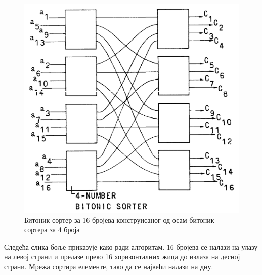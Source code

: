 \documentclass[12pt, a4paper]{article}
\theoremstyle{definition}
\begin{document}
\begin{figure}[H]
  \centering
      \includegraphics[scale=0.3]{slike/batcher16num}
  \caption{Битоник сортер за 16 бројева конструисаног од осам битоник сортера за 4 броја}
  \label{fig:batcher16num}
\end{figure}

Следећа слика боље приказује како ради алгоритам. 16 бројева се налази на улазу на левој страни и прелазе преко 16 хоризонталних жица до излаза на десној страни. Мрежа сортира елементе, тако да се највећи налази на дну.
\end{document}
